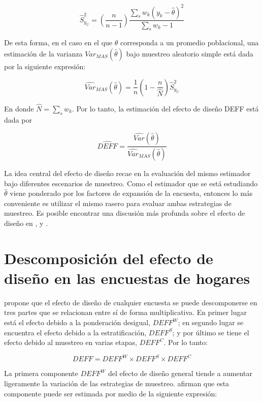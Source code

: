\documentclass[
  12pt,
]{book}
\begin{document}
\[
\hat{S}^2_{y_U} = \left(\frac{n}{n-1}\right)
\frac{\sum_s{ w_k ( y_k - \hat{\theta})^2}}{\sum_s{w_k} -1 }
\]

De esta forma, en el caso en el que \(\theta\) corresponda a un promedio poblacional, una estimación de la varianza \({Var}_{MAS}(\hat{\theta})\) bajo muestreo aleatorio simple está dada por la siguiente expresión:

\[
\widehat{Var}_{MAS}(\hat{\theta}) = \frac{1}{n} \left(1-\frac{n}{\hat N}\right)  \hat{S}^2_{y_U}
\]

En donde \(\hat N = \sum_s w_k\). Por lo tanto, la estimación del efecto de diseño DEFF está dada por

\[
\widehat{DEFF} = \frac{\widehat{Var}(\hat\theta)}{\widehat{Var}_{MAS}(\hat{\theta})}
\]

La idea central del efecto de diseño recae en la evaluación del mismo estimador bajo diferentes escenarios de muestreo. Como el estimador que se está estudiando \(\hat \theta\) viene ponderado por los factores de expansión de la encuesta, entonces lo más conveniente es utilizar el mismo rasero para evaluar ambas estrategias de muestreo. Es posible encontrar una discusión más profunda sobre el efecto de diseño en \citet[sección 4.]{Gambino_2009}, \citet[página 188]{Sarndal_Swensson_Wretman_2003} y \citet[página 101]{Gutierrez_Zhang_Montano_2016}.

\hypertarget{descomposiciuxf3n-del-efecto-de-diseuxf1o-en-las-encuestas-de-hogares}{%
\section{Descomposición del efecto de diseño en las encuestas de hogares}\label{descomposiciuxf3n-del-efecto-de-diseuxf1o-en-las-encuestas-de-hogares}}

\citet{Park_2003} propone que el efecto de diseño de cualquier encuesta se puede descomponerse en tres partes que se relacionan entre sí de forma multiplicativa. En primer lugar está el efecto debido a la ponderación desigual, \(DEFF^W\); en segundo lugar se encuentra el efecto debido a la estratificación, \(DEFF^S\); y por último se tiene el efecto debido al muestreo en varias etapas, \(DEFF^C\). Por lo tanto:

\[
DEFF = DEFF^W \times DEFF^S \times DEFF^C
\]

La primera componente \(DEFF^W\) del efecto de diseño general tiende a aumentar ligeramente la variación de las estrategias de muestreo. \citet{Valliant_Dever_Kreuter_2018} afirman que esta componente puede ser estimada por medio de la siguiente expresión:
\end{document}
